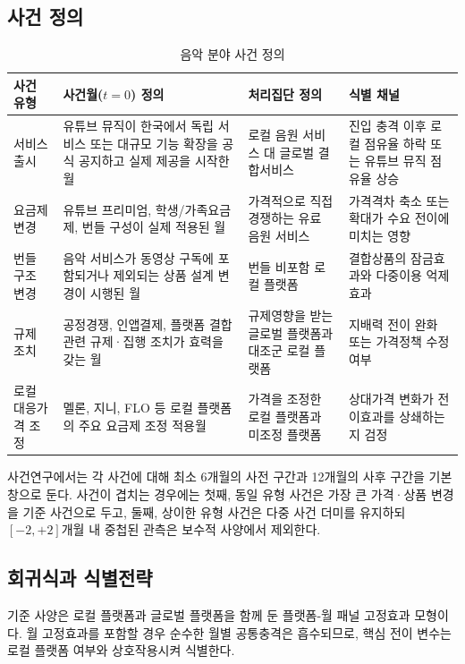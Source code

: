 \documentclass[11pt,a4paper]{report}
\begin{document}
\subsection{사건 정의}
\begin{table}[H]
  \centering
  \small
  \caption{음악 분야 사건 정의}\label{tab:music_event_definitions}
  \begin{tabular}{L{2.6cm}L{3.8cm}L{2.5cm}L{4.7cm}}
    \toprule
    사건 유형 & 사건월($t=0$) 정의 & 처리집단 정의 & 식별 채널 \\
    \midrule
    서비스 출시 & 유튜브 뮤직이 한국에서 독립 서비스 또는 대규모 기능 확장을 공식 공지하고 실제 제공을 시작한 월 & 로컬 음원 서비스 대 글로벌 결합서비스 & 진입 충격 이후 로컬 점유율 하락 또는 유튜브 뮤직 점유율 상승 \\
    요금제 변경 & 유튜브 프리미엄, 학생/가족요금제, 번들 구성이 실제 적용된 월 & 가격적으로 직접 경쟁하는 유료 음원 서비스 & 가격격차 축소 또는 확대가 수요 전이에 미치는 영향 \\
    번들 구조 변경 & 음악 서비스가 동영상 구독에 포함되거나 제외되는 상품 설계 변경이 시행된 월 & 번들 비포함 로컬 플랫폼 & 결합상품의 잠금효과와 다중이용 억제 효과 \\
    규제 조치 & 공정경쟁, 인앱결제, 플랫폼 결합 관련 규제·집행 조치가 효력을 갖는 월 & 규제영향을 받는 글로벌 플랫폼과 대조군 로컬 플랫폼 & 지배력 전이 완화 또는 가격정책 수정 여부 \\
    로컬 대응가격 조정 & 멜론, 지니, FLO 등 로컬 플랫폼의 주요 요금제 조정 적용월 & 가격을 조정한 로컬 플랫폼과 미조정 플랫폼 & 상대가격 변화가 전이효과를 상쇄하는지 검정 \\
    \bottomrule
  \end{tabular}
\end{table}

사건연구에서는 각 사건에 대해 최소 6개월의 사전 구간과 12개월의 사후 구간을 기본 창으로 둔다. 사건이 겹치는 경우에는 첫째, 동일 유형 사건은 가장 큰 가격·상품 변경을 기준 사건으로 두고, 둘째, 상이한 유형 사건은 다중 사건 더미를 유지하되 $[-2,+2]$개월 내 중첩된 관측은 보수적 사양에서 제외한다.

\subsection{회귀식과 식별전략}
기준 사양은 로컬 플랫폼과 글로벌 플랫폼을 함께 둔 플랫폼-월 패널 고정효과 모형이다. 월 고정효과를 포함할 경우 순수한 월별 공통충격은 흡수되므로, 핵심 전이 변수는 로컬 플랫폼 여부와 상호작용시켜 식별한다.
\end{document}
